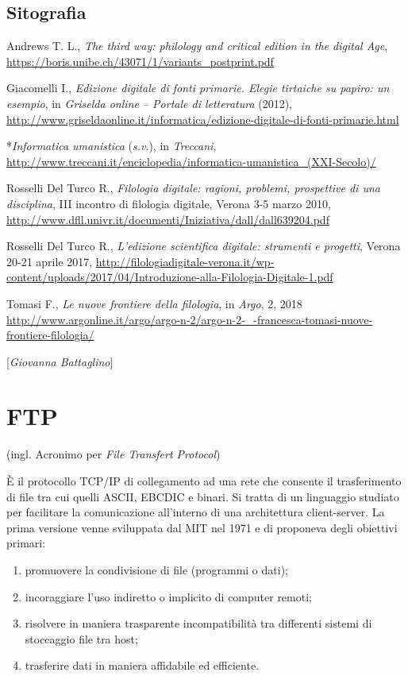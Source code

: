 {\section*{Sitografia}
{\parindent0pt 
Andrews T. L., \emph{The third way: philology and critical edition in
the digital Age},
\url{https://boris.unibe.ch/43071/1/variants_postprint.pdf}

Giacomelli I., \emph{Edizione digitale di fonti primarie. Elegie
tirtaiche su papiro: un esempio}, in \emph{Griselda online -- Portale di
letteratura} (2012),
\url{http://www.griseldaonline.it/informatica/edizione-digitale-di-fonti-primarie.html}

*\emph{Informatica umanistica} (\emph{s.v}.), in \emph{Treccani},
\url{http://www.treccani.it/enciclopedia/informatica-umanistica_(XXI-Secolo)/}

Rosselli Del Turco R., \emph{Filologia digitale: ragioni, problemi,
prospettive di una disciplina}, III incontro di filologia digitale,
Verona 3-5 marzo 2010,
\url{http://www.dfll.univr.it/documenti/Iniziativa/dall/dall639204.pdf}

Rosselli Del Turco R., \emph{L'edizione scientifica digitale: strumenti
e progetti}, Verona 20-21 aprile 2017,
\url{http://filologiadigitale-verona.it/wp-content/uploads/2017/04/Introduzione-alla-Filologia-Digitale-1.pdf}

Tomasi F., \emph{Le nuove frontiere della filologia}, in \emph{Argo}, 2,
2018
\url{http://www.argonline.it/argo/argo-n-2/argo-n-2-_-francesca-tomasi-nuove-frontiere-filologia/}
}

\hrulefill 

{[}\emph{Giovanna Battaglino}{]}




\chapter{FTP}

(ingl. Acronimo per \emph{File Transfert Protocol})

È il protocollo TCP/IP di collegamento ad una rete che consente il
trasferimento di file tra cui quelli ASCII, EBCDIC e binari. Si tratta
di un linguaggio studiato per facilitare la comunicazione all'interno di
una architettura client-server. La prima versione venne sviluppata dal
MIT nel 1971 e di proponeva degli obiettivi primari:

\begin{enumerate}
\def\labelenumi{\arabic{enumi}.}
\item
  promuovere la condivisione di file (programmi o dati);
\item
  incoraggiare l'uso indiretto o implicito di computer remoti;
\item
  risolvere in maniera trasparente incompatibilità tra differenti
  sistemi di stoccaggio file tra host;
\item
  trasferire dati in maniera affidabile ed efficiente.
\end{enumerate}

}
